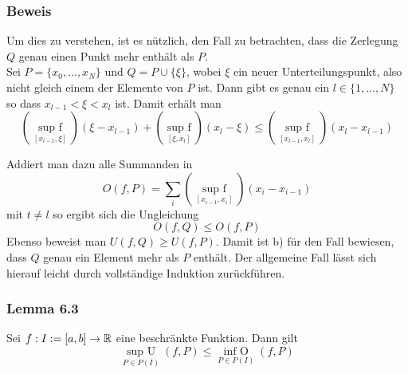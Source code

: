 \subsubsection*{Beweis} 
Um dies zu verstehen, ist es nützlich, den Fall zu betrachten, dass die Zerlegung $Q$ genau einen Punkt mehr enthält als $P$.\\

Sei $P=\{x_0,\dots ,x_N\}$ und $Q=P\cup \{\xi\}$, wobei $\xi$ ein neuer Unterteilungspunkt, also nicht gleich einem der Elemente von $P$ ist. Dann gibt es genau ein $l\in \{ 1,\dots,N\}$ so dass $x_{l-1}<\xi <x_l$ ist. Damit erhält man \[(\mathop {\sup {\text{ }}f}\limits_{[{x_{l - 1}},\xi ]} )(\xi  - {x_{l - 1}}) + (\mathop {\sup {\text{ }}f}\limits_{[\xi ,{x_l}]} )({x_l} - \xi ) \le (\mathop {\sup {\text{ }}f}\limits_{[{x_{l - 1}},{x_l}]} )({x_l} - {x_{l - 1}})\]


\begin{center}
\end{center}


Addiert man dazu alle Summanden in \[O(f,P)=\sum\limits_i {(\mathop {\sup {\text{ }}f}\limits_{[{x_{i - 1}},{x_i}]} )({x_i} - {x_{i - 1}})} \]
mit $t\neq l$ so ergibt sich die Ungleichung \[O(f,Q)\leq O(f,P)\]
Ebenso beweist man $U(f,Q)\geq U(f,P)$. Damit ist b) für den Fall bewiesen, dass $Q$ genau ein Element mehr als $P$ enthält. Der allgemeine Fall lässt sich hierauf leicht durch vollständige Induktion zurückführen. 

\subsubsection*{Lemma 6.3} Sei $f:I:=\lbrack a,b \rbrack \to \mathbb{R}$ eine beschränkte Funktion. Dann gilt \[\mathop {\sup {\text{ }}U}\limits_{P \in P(I)} (f,P) \le \mathop {\inf {\text{ }}O}\limits_{P \in P(I)} (f,P)\]

